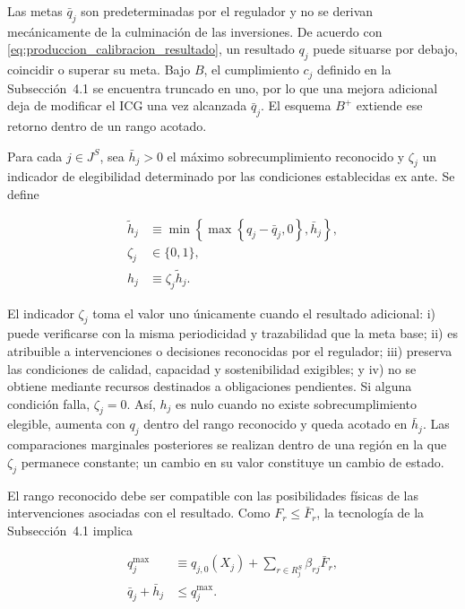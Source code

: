 Las metas \(\bar q_j\) son predeterminadas por el regulador y no se derivan mecánicamente de la culminación de las inversiones. De acuerdo con \eqref{eq:produccion_calibracion_resultado}, un resultado \(q_j\) puede situarse por debajo, coincidir o superar su meta. Bajo \(B\), el cumplimiento \(c_j\) definido en la Subsección~4.1 se encuentra truncado en uno, por lo que una mejora adicional deja de modificar el ICG una vez alcanzada \(\bar q_j\). El esquema \(B^{+}\) extiende ese retorno dentro de un rango acotado.

Para cada \(j\in J^{S}\), sea \(\bar h_j>0\) el máximo sobrecumplimiento reconocido y \(\zeta_j\) un indicador de elegibilidad determinado por las condiciones establecidas ex ante. Se define

\begin{subequations}
\label{eq:sobrecumplimiento_bplus}
\begin{align}
\widetilde h_j
&\equiv
\min
\left\{
\max\left\{q_j-\bar q_j,0\right\},
\bar h_j
\right\},
\label{eq:sobrecumplimiento_potencial_bplus}
\\
\zeta_j
&\in
\{0,1\},
\label{eq:elegibilidad_bplus}
\\
h_j
&\equiv
\zeta_j\widetilde h_j.
\label{eq:sobrecumplimiento_reconocido_bplus}
\end{align}
\end{subequations}

El indicador \(\zeta_j\) toma el valor uno únicamente cuando el resultado adicional: i) puede verificarse con la misma periodicidad y trazabilidad que la meta base; ii) es atribuible a intervenciones o decisiones reconocidas por el regulador; iii) preserva las condiciones de calidad, capacidad y sostenibilidad exigibles; y iv) no se obtiene mediante recursos destinados a obligaciones pendientes. Si alguna condición falla, \(\zeta_j=0\). Así, \(h_j\) es nulo cuando no existe sobrecumplimiento elegible, aumenta con \(q_j\) dentro del rango reconocido y queda acotado en \(\bar h_j\). Las comparaciones marginales posteriores se realizan dentro de una región en la que \(\zeta_j\) permanece constante; un cambio en su valor constituye un cambio de estado.

El rango reconocido debe ser compatible con las posibilidades físicas de las intervenciones asociadas con el resultado. Como \(F_r\leq\bar F_r\), la tecnología de la Subsección~4.1 implica

\begin{subequations}
\label{eq:factibilidad_sobrecumplimiento_bplus}
\begin{align}
q_j^{\max}
&\equiv
q_{j,0}(X_j)
+
\sum_{r\in R_j^{S}}
\beta_{rj}\bar F_r,
\label{eq:resultado_maximo_bplus}
\\
\bar q_j+\bar h_j
&\leq
q_j^{\max}.
\label{eq:compatibilidad_sobrecumplimiento_bplus}
\end{align}
\end{subequations}

